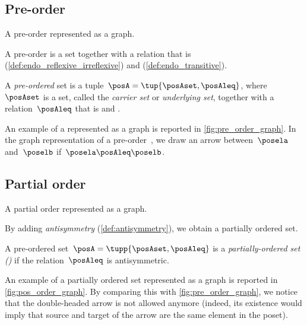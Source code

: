 
\vspace{2cm}

\subsection{Pre-order}
\begin{marginfigure}
    \centering
    \caption{A pre-order represented as a graph.}
    \label{fig:pre_order_graph}
\end{marginfigure}

A pre-order is a set together with a relation that is  (\cref{def:endo_reflexive_irreflexive}) and  (\cref{def:endo_transitive}).
\begin{ctdefinition}
    \label{def:preorder}
    A \emph{pre-ordered} set is a tuple~$\posA = \tup{\posAset,\posAleq}$, where~$\posAset$ is a set, called the \emph{carrier set} or \emph{underlying set}, together with a relation~$\posAleq$ that is
     and .
\end{ctdefinition}
An example of a  represented as a graph is reported in \cref{fig:pre_order_graph}.
In the graph representation of a pre-order~\posA, we draw an arrow between~$\posela$ and~$\poselb$ if~$\posela \posAleq \poselb$.

\vfill

\subsection{Partial order}

\begin{marginfigure}
    \centering
    \caption{A partial order represented as a graph.}
    \label{fig:pos_order_graph}
\end{marginfigure}
By adding \emph{antisymmetry} (\cref{def:antisymmetry}), we obtain a partially ordered set.

\begin{ctdefinition}
    \label{def:poset}
    A pre-ordered set~$\posA = \tupp{\posAset,\posAleq}$ is a \emph{partially-ordered set ()} if the relation~$\posAleq$ is antisymmetric.
\end{ctdefinition}

An example of a partially ordered set represented as a graph is reported in \cref{fig:pos_order_graph}.
By comparing this with \cref{fig:pre_order_graph}, we notice that the double-headed arrow is not allowed anymore (indeed, its existence would imply that source and target of the arrow are the same element in the poset).

